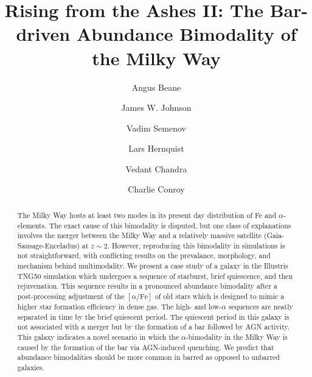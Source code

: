 \documentclass[twocolumn]{aastex631}
\newcommand{\alphaFe}{\ensuremath{[\alpha/\textrm{Fe}]}}
\begin{document}
\title{Rising from the Ashes II: The Bar-driven Abundance Bimodality of the Milky Way}

\author{Angus Beane}

\author{James W. Johnson}

\author{Vadim Semenov}

\author{Lars Hernquist}

\author{Vedant Chandra}

\author{Charlie Conroy}

\begin{abstract}
    The Milky Way hosts at least two modes in its present day distribution of Fe and $\alpha$-elements. The exact cause of this bimodality is disputed, but one class of explanations involves the merger between the Milky Way and a relatively massive satellite (Gaia-Sausage-Enceladus) at $z\sim2$. However, reproducing this bimodality in simulations is not straightforward, with conflicting results on the prevalance, morphology, and mechanism behind multimodality. We present a case study of a galaxy in the Illustris TNG50 simulation which undergoes a sequence of starburst, brief quiescence, and then rejuvenation. This sequence results in a pronounced abundance bimodality after a post-processing adjustment of the \alphaFe{} of old stars which is designed to mimic a higher star formation efficiency in dense gas. The high- and low-$\alpha$ sequences are neatly separated in time by the brief quiescent period. The quiescent period in this galaxy is not associated with a merger but by the formation of a bar followed by AGN activity. This galaxy indicates a novel scenario in which the $\alpha$-bimodality in the Milky Way is caused by the formation of the bar via AGN-induced quenching. We predict that abundance bimodalities should be more common in barred as opposed to unbarred galaxies.
  \end{abstract}
    
  
\end{document}

